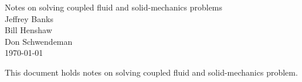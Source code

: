 \documentclass[11pt]{article}
\begin{document}


\def\comma  {~~~,~~}
\newcommand{\uvd}{\mathbf{U}}
\def\ud     {{    U}}
\def\pd     {{    P}}
\def\calo{{\cal O}}

\newcommand{\mbar}{\bar{m}}
\newcommand{\Rbar}{\bar{R}}
\newcommand{\Ru}{R_u}         %
\newcommand{\Div}{\grad\cdot}
\newcommand{\tauv}{\boldsymbol{\tau}}
\newcommand{\thetav}{\boldsymbol{\theta}}

\newcommand{\Omegav}{\boldsymbol{\Omega}}
\newcommand{\omegav}{\boldsymbol{\omega}}
\newcommand{\sigmav}{\boldsymbol{\sigma}}
\newcommand{\cm}{{\rm cm}}
\newcommand{\Jc}{{\mathcal J}}
\newcommand{\Fc}{{\mathcal F}}

\newcommand{\sumi}{\sum_{i=1}^n}
\newcommand{\dt}{{\Delta t}}

\def\ff {\tt} %



\newcommand{\bogus}[1]{}  %

\vspace{5\baselineskip}
\begin{flushleft}
{\Large
Notes on solving coupled fluid and solid-mechanics problems \\
}
\vspace{2\baselineskip}
Jeffrey Banks  \\
Bill Henshaw  \\
Don Schwendeman \\
\vspace{\baselineskip}
\today\\
\vspace{\baselineskip}

\vspace{4\baselineskip}


This document holds notes on solving coupled fluid and solid-mechanics problem. 

\end{flushleft}


\clearpage




\end{document}
